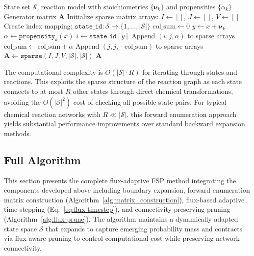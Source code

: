 \documentclass[onefignum,onetabnum]{siamart171218}
\begin{document}
\begin{algorithm}[H]
\caption{Forward Enumeration Matrix Construction}
\label{alg:matrix_construction}
\begin{algorithmic}[1]
\REQUIRE State set $\mathcal{S}$, reaction model with stoichiometries $\{\boldsymbol{\nu}_k\}$ and propensities $\{\alpha_k\}$
\ENSURE Generator matrix $\mathbf{A}$
\STATE Initialize sparse matrix arrays: $I \leftarrow []$, $J \leftarrow []$, $V \leftarrow []$
\STATE Create index mapping: $\texttt{state\_id}: \mathcal{S} \rightarrow \{1, \ldots, |\mathcal{S}|\}$
    \STATE $\text{col\_sum} \leftarrow 0$
        \STATE $y \leftarrow x + \boldsymbol{\nu}_k$
            \STATE $\alpha \leftarrow \texttt{propensity}_k(x)$
                \STATE $i \leftarrow \texttt{state\_id}[y]$
                \STATE Append $(i, j, \alpha)$ to sparse arrays
                \STATE $\text{col\_sum} \leftarrow \text{col\_sum} + \alpha$
            \ENDIF
        \ENDIF
    \ENDFOR
        \STATE Append $(j, j, -\text{col\_sum})$ to sparse arrays 
    \ENDIF
\ENDFOR
\STATE $\mathbf{A} \leftarrow \texttt{sparse}(I, J, V, |\mathcal{S}|, |\mathcal{S}|)$
\RETURN $\mathbf{A}$
\end{algorithmic}
\end{algorithm}

The computational complexity is $O(|\mathcal{S}| \cdot R)$ for iterating through states and reactions. This exploits the sparse structure of the reaction graph as each state connects to at most $R$ other states through direct chemical transformations, avoiding the $O(|\mathcal{S}|^2)$ cost of checking all possible state pairs. For typical chemical reaction networks with $R \ll |\mathcal{S}|$, this forward enumeration approach yields substantial performance improvements over standard backward expansion methods.

\subsection{Full Algorithm}
\label{sec:full-algorithm}
This section presents the complete flux-adaptive FSP method integrating the components developed above including boundary expansion, forward enumeration matrix construction (Algorithm~\ref{alg:matrix_construction}), flux-based adaptive time stepping (Eq.~\eqref{eq:flux-timestep}), and connectivity-preserving pruning (Algorithm~\ref{alg:flux-prune}). The algorithm maintains a dynamically adapted state space $\mathcal{S}$ that expands to capture emerging probability mass and contracts via flux-aware pruning to control computational cost while preserving network connectivity.
\end{document}

